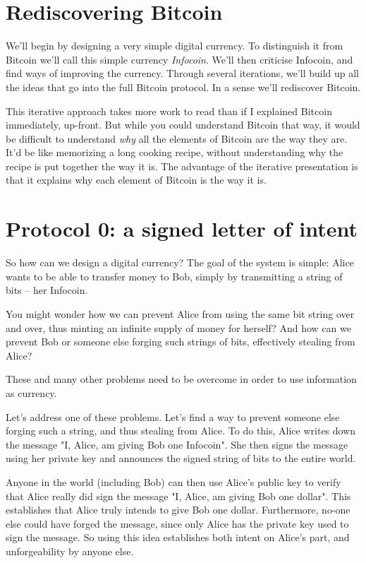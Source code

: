 \documentclass[12pt]{book}
\newcounter{problem}[chapter]
\begin{document}
\section{Rediscovering Bitcoin}

We'll begin by designing a very simple digital currency.  To
distinguish it from Bitcoin we'll call this simple currency
\emph{Infocoin}.  We'll then criticise Infocoin, and find ways of
improving the currency.  Through several iterations, we'll build up
all the ideas that go into the full Bitcoin protocol.  In a sense
we'll rediscover Bitcoin.

This iterative approach takes more work to read than if I explained
Bitcoin immediately, up-front.  But while you could understand Bitcoin
that way, it would be difficult to understand \emph{why} all the
elements of Bitcoin are the way they are.  It'd be like memorizing a
long cooking recipe, without understanding why the recipe is put
together the way it is.  The advantage of the iterative presentation
is that it explains why each element of Bitcoin is the way it is.

\section{Protocol 0: a signed letter of intent}

So how can we design a digital currency?  The goal of the system is
simple: Alice wants to be able to transfer money to Bob, simply by
transmitting a string of bits -- her Infocoin.

You might wonder how we can prevent Alice from using the same bit
string over and over, thus minting an infinite supply of money for
herself?  And how can we prevent Bob or someone else forging such
strings of bits, effectively stealing from Alice?

These and many other problems need to be overcome in order to use
information as currency.

Let's address one of these problems.  Let's find a way to prevent
someone else forging such a string, and thus stealing from Alice.  To
do this, Alice writes down the message "I, Alice, am giving Bob one
Infocoin".  She then signs the message using her private key and
announces the signed string of bits to the entire world.

Anyone in the world (including Bob) can then use Alice's public key to
verify that Alice really did sign the message "I, Alice, am giving Bob
one dollar".  This establishes that Alice truly intends to give Bob
one dollar. Furthermore, no-one else could have forged the message,
since only Alice has the private key used to sign the message.  So
using this idea establishes both intent on Alice's part, and
unforgeability by anyone else.  
\end{document}
